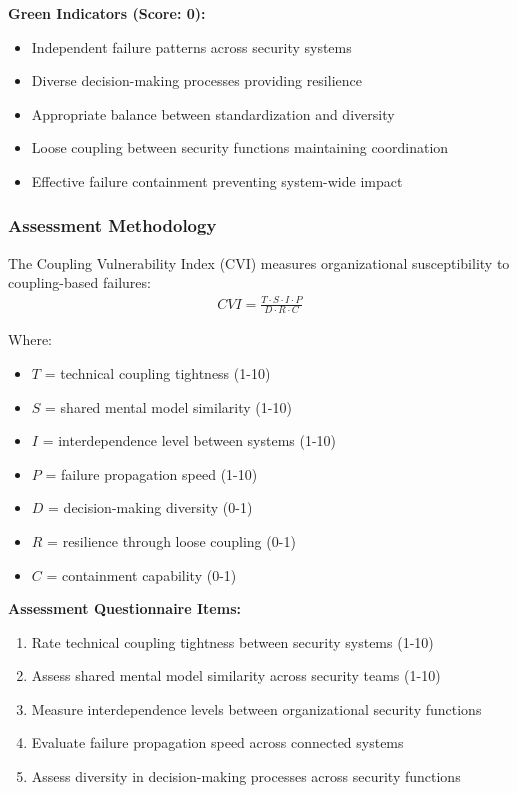 \documentclass[11pt,a4paper]{article}
\begin{document}
\textbf{Green Indicators (Score: 0):}
\begin{itemize}
\item Independent failure patterns across security systems
\item Diverse decision-making processes providing resilience
\item Appropriate balance between standardization and diversity
\item Loose coupling between security functions maintaining coordination
\item Effective failure containment preventing system-wide impact
\end{itemize}

\subsubsection{Assessment Methodology}

The Coupling Vulnerability Index (CVI) measures organizational susceptibility to coupling-based failures:
\begin{align}
CVI = \frac{T \cdot S \cdot I \cdot P}{D \cdot R \cdot C}
\end{align}

Where:
\begin{itemize}
\item $T$ = technical coupling tightness (1-10)
\item $S$ = shared mental model similarity (1-10)
\item $I$ = interdependence level between systems (1-10)
\item $P$ = failure propagation speed (1-10)
\item $D$ = decision-making diversity (0-1)
\item $R$ = resilience through loose coupling (0-1)
\item $C$ = containment capability (0-1)
\end{itemize}

\textbf{Assessment Questionnaire Items:}
\begin{enumerate}
\item Rate technical coupling tightness between security systems (1-10)
\item Assess shared mental model similarity across security teams (1-10)
\item Measure interdependence levels between organizational security functions
\item Evaluate failure propagation speed across connected systems
\item Assess diversity in decision-making processes across security functions
\end{enumerate}
\end{document}
